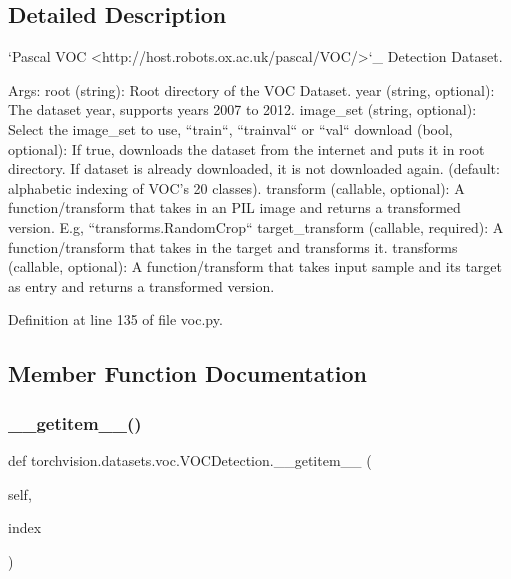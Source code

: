 \subsection{Detailed Description}
\begin{DoxyVerb}`Pascal VOC <http://host.robots.ox.ac.uk/pascal/VOC/>`_ Detection Dataset.

Args:
    root (string): Root directory of the VOC Dataset.
    year (string, optional): The dataset year, supports years 2007 to 2012.
    image_set (string, optional): Select the image_set to use, ``train``, ``trainval`` or ``val``
    download (bool, optional): If true, downloads the dataset from the internet and
        puts it in root directory. If dataset is already downloaded, it is not
        downloaded again.
        (default: alphabetic indexing of VOC's 20 classes).
    transform (callable, optional): A function/transform that  takes in an PIL image
        and returns a transformed version. E.g, ``transforms.RandomCrop``
    target_transform (callable, required): A function/transform that takes in the
        target and transforms it.
    transforms (callable, optional): A function/transform that takes input sample and its target as entry
        and returns a transformed version.
\end{DoxyVerb}
 

Definition at line 135 of file voc.\+py.



\subsection{Member Function Documentation}
\mbox{\label{classtorchvision_1_1datasets_1_1voc_1_1VOCDetection_ac4f9de50ff56feb893981db660d24e78}} 
\subsubsection{\texorpdfstring{\+\_\+\+\_\+getitem\+\_\+\+\_\+()}{\_\_getitem\_\_()}}
{\footnotesize\ttfamily def torchvision.\+datasets.\+voc.\+V\+O\+C\+Detection.\+\_\+\+\_\+getitem\+\_\+\+\_\+ (\begin{DoxyParamCaption}\item[{}]{self,  }\item[{}]{index }\end{DoxyParamCaption})}

